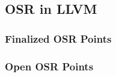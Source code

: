 \subsection{OSR in LLVM}
\label{se:osr-llvm}

\subsubsection{Finalized OSR Points}

\subsubsection{Open OSR Points}
  
  
  